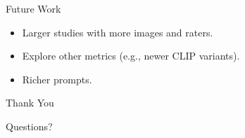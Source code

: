\documentclass[aspectratio=169]{beamer}
\begin{document}

\begin{frame}{Future Work}
  \begin{itemize}
    \item Larger studies with more images and raters.
    \item Explore other metrics (e.g., newer CLIP variants).
    \item Richer prompts.
  \end{itemize}
\end{frame}

\begin{frame}{Thank You}
  \begin{center}
    \LARGE Questions?
  \end{center}
\end{frame}
\end{document}
